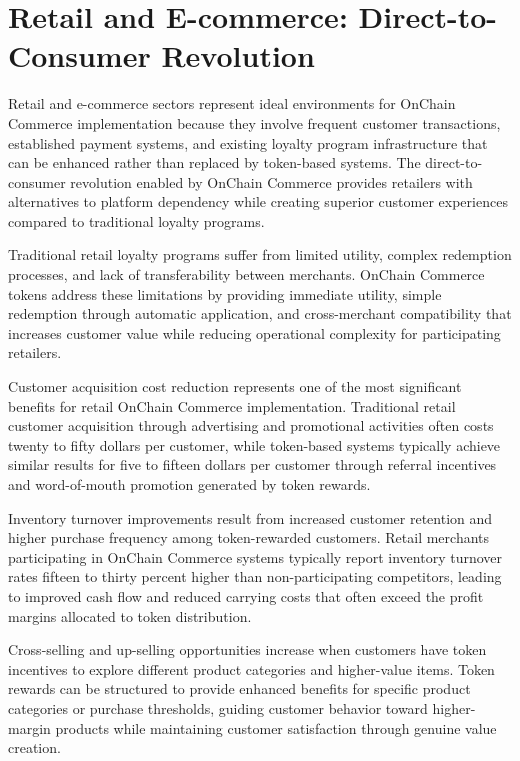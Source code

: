 \documentclass[
  Letterpaper,
]{scrbook}
\begin{document}
\section{Retail and E-commerce: Direct-to-Consumer
Revolution}\label{retail-and-e-commerce-direct-to-consumer-revolution}

Retail and e-commerce sectors represent ideal environments for OnChain
Commerce implementation because they involve frequent customer
transactions, established payment systems, and existing loyalty program
infrastructure that can be enhanced rather than replaced by token-based
systems. The direct-to-consumer revolution enabled by OnChain Commerce
provides retailers with alternatives to platform dependency while
creating superior customer experiences compared to traditional loyalty
programs.

Traditional retail loyalty programs suffer from limited utility, complex
redemption processes, and lack of transferability between merchants.
OnChain Commerce tokens address these limitations by providing immediate
utility, simple redemption through automatic application, and
cross-merchant compatibility that increases customer value while
reducing operational complexity for participating retailers.

Customer acquisition cost reduction represents one of the most
significant benefits for retail OnChain Commerce implementation.
Traditional retail customer acquisition through advertising and
promotional activities often costs twenty to fifty dollars per customer,
while token-based systems typically achieve similar results for five to
fifteen dollars per customer through referral incentives and
word-of-mouth promotion generated by token rewards.

Inventory turnover improvements result from increased customer retention
and higher purchase frequency among token-rewarded customers. Retail
merchants participating in OnChain Commerce systems typically report
inventory turnover rates fifteen to thirty percent higher than
non-participating competitors, leading to improved cash flow and reduced
carrying costs that often exceed the profit margins allocated to token
distribution.

Cross-selling and up-selling opportunities increase when customers have
token incentives to explore different product categories and
higher-value items. Token rewards can be structured to provide enhanced
benefits for specific product categories or purchase thresholds, guiding
customer behavior toward higher-margin products while maintaining
customer satisfaction through genuine value creation.
\end{document}
